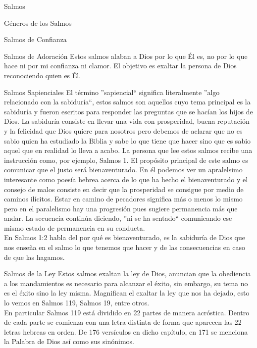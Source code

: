 \begin{section}{Salmos}
\begin{subsection}{Géneros de los Salmos}
\begin{subsubsection}{Salmos de Confianza}
		\end{subsubsection}
		\begin{subsubsection}{Salmos de Adoración}
			Estos salmos alaban a Dios por lo que Él es, no por lo que hace ni por mi confianza ni clamor. El objetivo es exaltar la persona de Dios reconociendo quien es Él.
			\newpage
		\end{subsubsection}
		\begin{subsubsection}{Salmos Sapienciales}
			El término ''sapiencial`` significa literalmente ''algo relacionado con la sabiduría``, estos salmos son aquellos cuyo tema principal es la sabiduría y fueron escritos para responder las preguntas que se hacían los hijos de Dios. La sabiduría consiste en llevar una vida con prosperidad, buena reputación y la felicidad que Dios quiere para nosotros pero debemos de aclarar que no es sabio quien ha estudiado la Biblia y sabe lo que tiene que hacer sino que es sabio aquel que en realidad lo lleva a acabo. La persona que lee estos salmos recibe una instrucción como, por ejemplo, Salmos 1. El propósito principal de este salmo es comunicar que el justo será bienaventurado. En él podemos ver un apralelsimo interesante como poesía hebrea acerca de lo que ha hecho el bienaventurado y el consejo de malos consiste en decir que la prosperidad se consigue por medio de caminos ilícitos. Estar en camino de pecadores significa más o menos lo mismo pero en el paralelismo hay una progresión pues sugiere permanencia más que andar. La secuencia continúa diciendo, ''ni se ha sentado`` comunicando ese mismo estado de permanencia en su conducta.\\
			En Salmos 1:2 habla del por qué es bienaventurado, es la sabiduría de Dios que nos enseña en el salmo lo que tenemos que hacer y de las consecuencias en caso de que las hagamos.
		\end{subsubsection}
		\begin{subsubsection}{Salmos de la Ley}
			Estos salmos exaltan la ley de Dios, anuncian que la obediencia a los mandamientos es necesario para alcanzar el éxito, sin embargo, su tema no es el éxito sino la ley misma. Magnifican el exaltar la ley que nos ha dejado, esto lo vemos en Salmos 119, Salmos 19, entre otros.\\
			En particular Salmos 119 está dividido en 22 partes de manera acróstica. Dentro de cada parte se comienza con una letra distinta de forma que aparecen las 22 letras hebreas en orden. De 176 versículos en dicho capítulo, en 171 se menciona la Palabra de Dios así como sus sinónimos.\\

\end{subsubsection}
\end{subsection}
\end{section}
